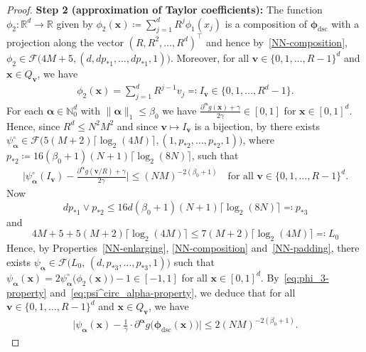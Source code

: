 \documentclass[12pt]{article}
\begin{document}
\begin{proof}
    \medskip \textbf{Step 2 (approximation of Taylor coefficients):} The function $\phi_2:\mathbb{R}^d \rightarrow \mathbb{R}$ given by $\phi_2(\bm x) \coloneqq \sum_{j=1}^d R^j \phi_1(x_j)$ is a composition of $\bm \phi_{\mathrm{dsc}}$ with a projection along the vector $(R,R^2,\ldots,R^d)^\top$ and hence by~\ref{NN-composition}, $\phi_2 \in \mathcal{F}\bigl(4M+5, (d, dp_{*1}, \ldots, dp_{*1}, 1) \bigr)$.  Moreover, for all $\bm v \in \{0,1,\ldots,R-1\}^d$ and $\bm x \in Q_{\bm v}$, we have
    \begin{align}
        \phi_2(\bm x) = \sum_{j=1}^d R^{j-1}v_j \eqqcolon I_{\bm v} \in \{0,1,\ldots,R^d-1\}. \label{eq:phi_3-property}
    \end{align}
    For each $\bm\alpha \in \mathbb{N}_0^d$ with $\|\bm\alpha\|_1 \leq \beta_0$ we have $\frac{\partial^{\bm\alpha} g(\bm x) + \gamma}{2\gamma} \in [0,1]$ for $\bm x \in [0,1]^d$.  Hence, since $R^d \leq N^2M^2$ and since $\bm{v} \mapsto I_{\bm{v}}$ is a bijection, by \citet[Proposition~4.4]{lu2021deep} there exists $\psi_{\bm\alpha}^\circ \in \mathcal{F}\bigl(5(M+2)\lceil\log_2(4M)\rceil, (1,p_{*2},\ldots,p_{*2},1)\bigr)$, where $p_{*2} \coloneqq 16(\beta_0+1)(N+1) \lceil\log_2(8N)\rceil$, such that
    \begin{align}
        \biggl| \psi_{\bm\alpha}^\circ(I_{\bm v}) - \frac{\partial^{\bm\alpha} g(\bm v/R) + \gamma}{2\gamma} \biggr| \leq (NM)^{-2(\beta_0+1)} \quad\text{for all } \bm v \in \{0,1,\ldots,R-1\}^d. \label{eq:psi^circ_alpha-property}
    \end{align}
    Now
    \[
    dp_{*1} \vee p_{*2} \leq 16d(\beta_0+1)(N+1)\lceil\log_2(8N)\rceil \eqqcolon p_{*3}
    \]
    and 
    \[
    4M+5+5(M+2)\lceil\log_2(4M)\rceil \leq 7(M+2)\lceil\log_2(4M)\rceil \eqqcolon L_0
    \]
    Hence, by Properties~\ref{NN-enlarging}, \ref{NN-composition} and~\ref{NN-padding}, there exists $\psi_{\bm\alpha} \in \mathcal{F}\bigl(L_0,\, (d,p_{*3},\ldots,p_{*3},1)\bigr)$ such that $\psi_{\bm\alpha}(\bm x) = 2\psi_{\bm\alpha}^\circ\bigl(\phi_2(\bm x)\bigr) - 1 \in [-1,1]$ for all $\bm x \in [0,1]^d$.  By~\eqref{eq:phi_3-property} and~\eqref{eq:psi^circ_alpha-property}, we deduce that for all $\bm v \in \{0,1,\ldots,R-1\}^d$ and $\bm x \in Q_{\bm v}$, we have
    \begin{align}
        \biggl| \psi_{\bm\alpha}(\bm x) - \frac{1}{\gamma} \cdot \partial^{\bm\alpha} g\bigl(\bm{\phi}_{\mathrm{dsc}}(\bm{x})\bigr) \biggr| \leq 2(NM)^{-2(\beta_0+1)}. \label{eq:psi_alpha-property}
    \end{align}


\end{proof}
\end{document}
